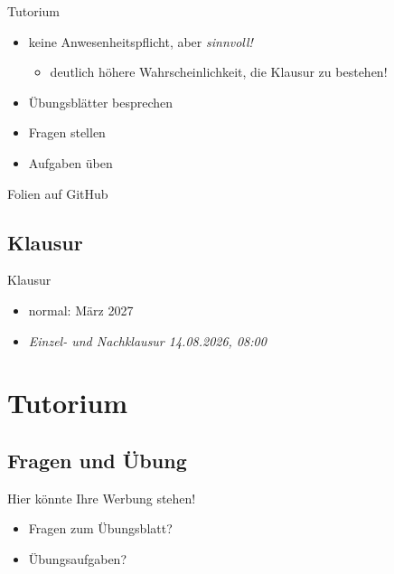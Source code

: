 \documentclass[aspectratio=169,usepdftitle=true,11pt,ngerman,t]{beamer}
\begin{document}
\begin{frame}{Tutorium}\onslide<+->
    \begin{itemize}[<+->]
        \item keine Anwesenheitspflicht\onslide<+->, aber \emph{sinnvoll!}
        \begin{itemize}
            \item deutlich höhere Wahrscheinlichkeit, die Klausur zu bestehen!
        \end{itemize}
        \item Übungsblätter besprechen
        \item Fragen stellen
        \item Aufgaben üben
    \end{itemize}
    \onslide<+->\vspace{1em}
    \begin{block}{Folien auf GitHub}
        \centering{}
    \end{block}
\end{frame}

\subsection{Klausur}

\begin{frame}{Klausur}\onslide<+->
    \begin{itemize}[<+->]
        \item normal: März 2027
        \item \textit{\color{lightgray} Einzel- und Nachklausur 14.08.2026, 08:00}
    \end{itemize}
\end{frame}

\section[Das nullte Tutorium]{Tutorium}

\subsection{Fragen und Übung}

\begin{frame}{Hier könnte Ihre Werbung stehen!}\onslide<+->
    \begin{itemize}[<+->]
        \item Fragen zum Übungsblatt?
        \item Übungsaufgaben?
    \end{itemize}
\end{frame}
\end{document}

